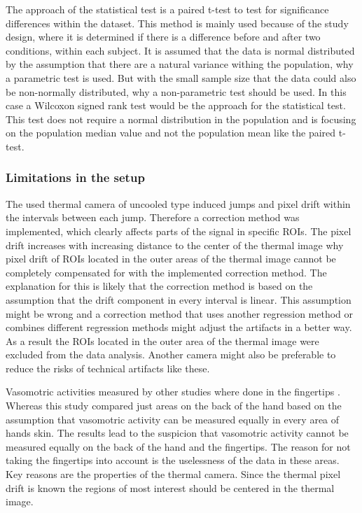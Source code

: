 The approach of the statistical test is a paired t-test to test for significance differences within the dataset. This method is mainly used because of the study design, where it is determined if there is a difference before and after two conditions, within each subject. It is assumed that the data is normal distributed by the assumption that there are a natural variance withing the population, why a parametric test is used. But with the small sample size that the data could also be non-normally distributed, why a non-parametric test should be used. In this case a Wilcoxon signed rank test would be the approach for the statistical test. This test does not require a normal distribution in the population and is focusing on the population median value and not the population mean like the paired t-test\cite{imam2014}.

\subsubsection{Limitations in the setup}
The used thermal camera of uncooled type induced jumps and pixel drift within the intervals between each jump. Therefore a correction method was implemented, which clearly affects parts of the signal in specific ROIs. The pixel drift increases with increasing distance to the center of the thermal image why pixel drift of ROIs located in the outer areas of the thermal image cannot be completely compensated for with the implemented correction method. The explanation for this is likely that the correction method is based on the assumption that the drift component in every interval is linear. This assumption might be wrong and a correction method that uses another regression method or combines different regression methods might adjust the artifacts in a better way. As a result the ROIs located in the outer area of the thermal image were excluded from the data analysis. Another camera might also be preferable to reduce the risks of technical artifacts like these. 

Vasomotric activities measured by other studies where done in the fingertips \cite{sagaidachnyi2012a, sagaidachnyi2014}. Whereas this study compared just areas on the back of the hand based on the assumption that vasomotric activity can be measured equally in every area of hands skin. The results lead to the suspicion that vasomotric activity cannot be measured equally on the back of the hand and the fingertips. The reason for not taking the fingertips into account is the uselessness of the data in these areas. Key reasons are the properties of the thermal camera. Since the thermal pixel drift is known the regions of most interest should be centered in the thermal image. 

